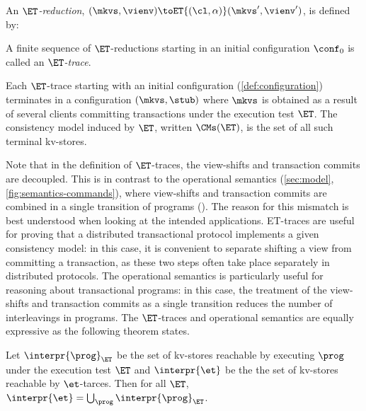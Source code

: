 \begin{definition}[ET-reduction]
An \emph{\(\ET\)-reduction}, \((\mkvs, \vienv) \toET{(\cl, \alpha)} (\mkvs', \vienv')\), is defined by:
A finite sequence of \(\ET\)-reductions starting in an
initial configuration \(\conf_{0}\) is called  an \emph{\(\ET\)-trace}. 
\end{definition}
Each \(\ET\)-trace  starting with an initial configuration
(\cref{def:configuration}) terminates in a configuration \((\mkvs, \stub)\) where \(\mkvs\) is obtained as a result of several clients committing transactions under the 
execution test \(\ET\). The consistency model induced by \(\ET\), 
written \(\CMs(\ET)\), is the set of all such terminal kv-stores.

Note that in the definition of \(\ET\)-traces, the view-shifts and 
transaction commits are decoupled. This is in contrast to the
operational semantics (\cref{sec:model}, \cref{fig:semantics-commands}), 
where view-shifts and transaction commits are combined in a single transition of programs (). 
The reason for this mismatch is best understood when looking at the
intended applications. 
ET-traces are useful for 
proving that a distributed transactional 
protocol implements a given consistency model: in this case, it is convenient to separate shifting a view from committing a transaction, 
as these two steps often take place separately in distributed
protocols. The operational semantics  is particularly useful for  reasoning about transactional 
programs: in this case, the treatment of the view-shifts and transaction commits as a single transition reduces the number of interleavings in programs.
The \(\ET\)-traces and operational semantics are equally expressive as
the following theorem states. 

\begin{theorem}
	\label{thm:ettraces2sem}
	Let \(\interpr{\prog}_{\ET}\) be the set of kv-stores reachable by executing \(\prog\) under the execution test \(\ET\) and  \( \interpr{\et} \) be the the set of kv-stores reachable by \( \et \)-tarces.
    Then for all \(\ET\), \(\interpr{\et} = \bigcup_{\prog} \interpr{\prog}_{\ET}\).
\end{theorem}
